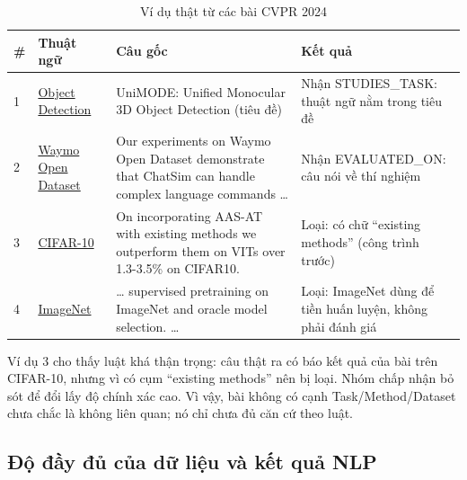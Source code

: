 \documentclass[11pt,a4paper]{article}
\begin{document}
\begin{table}[H]
\small\centering
\renewcommand{\arraystretch}{1.2}
\caption{Ví dụ thật từ các bài CVPR 2024}
\label{tab:a3}
\begin{tabularx}{\textwidth}{@{}l >{\raggedright\arraybackslash}p{2.6cm} >{\raggedright\arraybackslash}X >{\raggedright\arraybackslash}p{3.6cm}@{}}
\toprule
\textbf{\#} & \textbf{Thuật ngữ} & \textbf{Câu gốc} & \textbf{Kết quả}\\
\midrule
1 & \href{https://openaccess.thecvf.com/content/CVPR2024/html/Li_UniMODE_Unified_Monocular_3D_Object_Detection_CVPR_2024_paper.html}{Object Detection} & UniMODE: Unified Monocular 3D Object Detection (tiêu đề) & Nhận STUDIES\_TASK: thuật ngữ nằm trong tiêu đề\\
2 & \href{https://openaccess.thecvf.com/content/CVPR2024/html/Wei_Editable_Scene_Simulation_for_Autonomous_Driving_via_Collaborative_LLM-Agents_CVPR_2024_paper.html}{Waymo Open Dataset} & Our experiments on Waymo Open Dataset demonstrate that ChatSim can handle complex language commands \ldots{} & Nhận EVALUATED\_ON: câu nói về thí nghiệm\\
3 & \href{https://openaccess.thecvf.com/content/CVPR2024/html/Jain_Towards_Understanding_and_Improving_Adversarial_Robustness_of_Vision_Transformers_CVPR_2024_paper.html}{CIFAR-10} & On incorporating AAS-AT with existing methods we outperform them on VITs over 1.3-3.5\% on CIFAR10. & Loại: có chữ ``existing methods'' (công trình trước)\\
4 & \href{https://openaccess.thecvf.com/content/CVPR2024/html/Yu_Rethinking_the_Evaluation_Protocol_of_Domain_Generalization_CVPR_2024_paper.html}{ImageNet} & \ldots{} supervised pretraining on ImageNet and oracle model selection. \ldots{} & Loại: ImageNet dùng để tiền huấn luyện, không phải đánh giá\\
\bottomrule
\end{tabularx}
\end{table}

Ví dụ 3 cho thấy luật khá thận trọng: câu thật ra có báo kết quả của bài trên CIFAR-10, nhưng vì có cụm ``existing methods'' nên bị loại. Nhóm chấp nhận bỏ sót để đổi lấy độ chính xác cao. Vì vậy, bài không có cạnh Task/Method/Dataset chưa chắc là không liên quan; nó chỉ chưa đủ căn cứ theo luật.

\subsection{Độ đầy đủ của dữ liệu và kết quả NLP}\label{sec:coverage}
\end{document}
